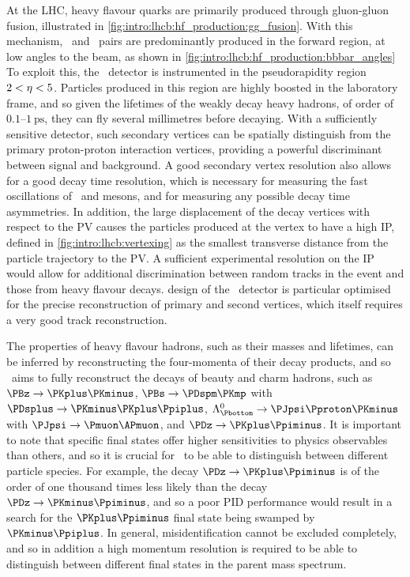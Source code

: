 At the \ac{LHC}, heavy flavour quarks are primarily produced through 
gluon-gluon fusion, illustrated in 
\cref{fig:intro:lhcb:hf_production:gg_fusion}.
With this mechanism, \bbbar\ and \ccbar\ pairs are predominantly produced in 
the forward region, at low angles to the beam, as shown in 
\cref{fig:intro:lhcb:hf_production:bbbar_angles}
To exploit this, the \lhcb\ detector is instrumented in the pseudorapidity 
region $2 < \eta < 5$.
Particles produced in this region are highly boosted in the laboratory frame, 
and so given the lifetimes of the weakly decay heavy hadrons, of order of 
$0.1$--$\SI{1}{\pico\second}$, they can fly several millimetres before 
decaying.
With a sufficiently sensitive detector, such secondary vertices can be 
spatially distinguish from the primary proton-proton interaction vertices, 
providing a powerful discriminant between signal and background.
A good secondary vertex resolution also allows for a good decay time 
resolution, which is necessary for measuring the fast oscillations of \PBds\ 
and \PDzero mesons, and for measuring any possible decay time asymmetries.
In addition, the large displacement of the decay vertices with respect to the 
\ac{PV} causes the particles produced at the vertex to have a high \ac{IP}, 
defined in \cref{fig:intro:lhcb:vertexing} as the smallest transverse distance 
from the particle trajectory to the \ac{PV}.
A sufficient experimental resolution on the \ac{IP} would allow for additional 
discrimination between random tracks in the event and those from heavy flavour 
decays.
design of the \lhcb\ detector is particular optimised for the precise 
reconstruction of primary and second vertices, which itself requires a very 
good track reconstruction.

The properties of heavy flavour hadrons, such as their masses and lifetimes, 
can be inferred by reconstructing the four-momenta of their decay products, and 
so \lhcb\ aims to fully reconstruct the decays of beauty and charm hadrons, 
such as $\decay{\PBz}{\PKplus\PKminus}$, $\decay{\PBs}{\PDspm\PKmp}$ with 
$\decay{\PDsplus}{\PKminus\PKplus\Ppiplus}$, 
$\decay{\PLambdab}{\PJpsi\Pproton\PKminus}$ with 
$\decay{\PJpsi}{\Pmuon\APmuon}$, and $\decay{\PDz}{\PKplus\Ppiminus}$.
It is important to note that specific final states offer higher sensitivities 
to physics observables than others, and so it is crucial for \lhcb\ to be able 
to distinguish between different particle species.
For example, the decay $\decay{\PDz}{\PKplus\Ppiminus}$ is of the order of one 
thousand times less likely than the decay $\decay{\PDz}{\PKminus\Ppiminus}$, 
and so a poor \ac{PID} performance would result in a search for the 
$\PKplus\Ppiminus$ final state being swamped by $\PKminus\Ppiplus$.
In general, misidentification cannot be excluded completely, and so in addition 
a high momentum resolution is required to be able to distinguish between 
different final states in the parent mass spectrum.

